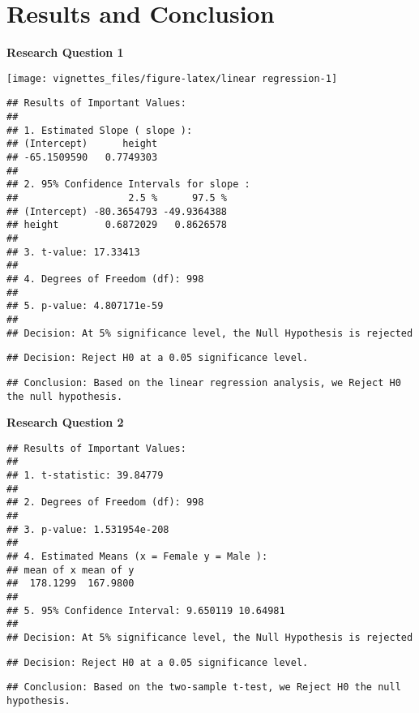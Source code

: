 \documentclass[
]{article}
\begin{document}
\hypertarget{results-and-conclusion}{%
\section{Results and Conclusion}\label{results-and-conclusion}}

\textbf{Research Question 1}

\begin{center}\texttt{[image: vignettes\_files/figure-latex/linear regression-1]} \end{center}

\begin{verbatim}
## Results of Important Values: 
## 
## 1. Estimated Slope ( slope ):
## (Intercept)      height 
## -65.1509590   0.7749303 
## 
## 2. 95% Confidence Intervals for slope :
##                   2.5 %      97.5 %
## (Intercept) -80.3654793 -49.9364388
## height        0.6872029   0.8626578
## 
## 3. t-value: 17.33413 
## 
## 4. Degrees of Freedom (df): 998 
## 
## 5. p-value: 4.807171e-59 
## 
## Decision: At 5% significance level, the Null Hypothesis is rejected
\end{verbatim}

\begin{verbatim}
## Decision: Reject H0 at a 0.05 significance level.
\end{verbatim}

\begin{verbatim}
## Conclusion: Based on the linear regression analysis, we Reject H0 the null hypothesis.
\end{verbatim}

\textbf{Research Question 2}

\begin{verbatim}
## Results of Important Values: 
## 
## 1. t-statistic: 39.84779 
## 
## 2. Degrees of Freedom (df): 998 
## 
## 3. p-value: 1.531954e-208 
## 
## 4. Estimated Means (x = Female y = Male ):
## mean of x mean of y 
##  178.1299  167.9800 
## 
## 5. 95% Confidence Interval: 9.650119 10.64981 
## 
## Decision: At 5% significance level, the Null Hypothesis is rejected
\end{verbatim}

\begin{verbatim}
## Decision: Reject H0 at a 0.05 significance level.
\end{verbatim}

\begin{verbatim}
## Conclusion: Based on the two-sample t-test, we Reject H0 the null hypothesis.
\end{verbatim}
\end{document}
